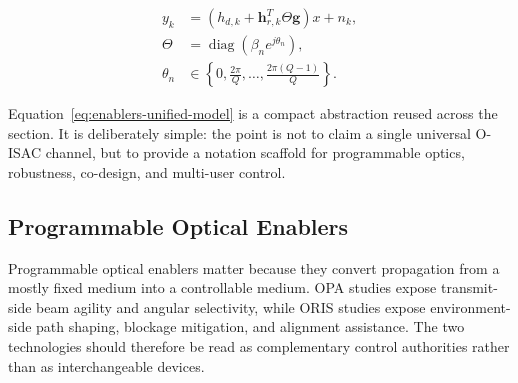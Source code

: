 \begin{equation}
\label{eq:enablers-unified-model}
\begin{aligned}
y_k &= \left(h_{d,k} + \mathbf{h}_{r,k}^{T}\Theta\mathbf{g}\right)x + n_k, \\
\Theta &= \operatorname{diag}\!\left(\beta_n e^{j\theta_n}\right), \\
\theta_n &\in \left\{0,\frac{2\pi}{Q},\ldots,\frac{2\pi(Q-1)}{Q}\right\}.
\end{aligned}
\end{equation}

Equation~\eqref{eq:enablers-unified-model} is a compact abstraction reused across the section. It is deliberately simple: the point is not to claim a single universal O-ISAC channel, but to provide a notation scaffold for programmable optics, robustness, co-design, and multi-user control.

\subsection{Programmable Optical Enablers}
\label{sec:enablers-programmable}

Programmable optical enablers matter because they convert propagation from a mostly fixed medium into a controllable medium. OPA studies expose transmit-side beam agility and angular selectivity, while ORIS studies expose environment-side path shaping, blockage mitigation, and alignment assistance. The two technologies should therefore be read as complementary control authorities rather than as interchangeable devices.

